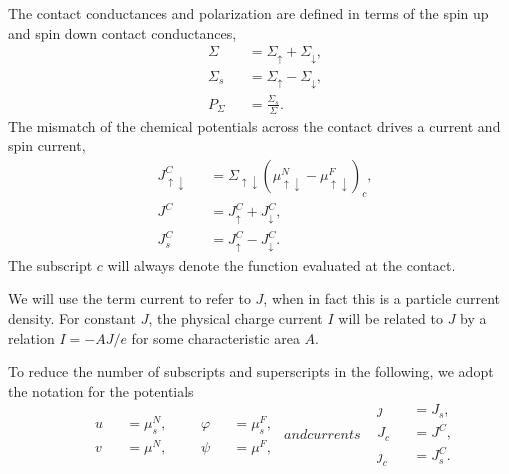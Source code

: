 The contact conductances and polarization are defined in terms
of the spin up and spin down contact conductances,
\begin{subequations}
  \label{eq:contact_conductances}
  \begin{alignat}{2}
    & Σ   && = Σ_↑ + Σ_↓ , \\
    & Σ_s && = Σ_↑ - Σ_↓ , \\
    & P_Σ && = \frac{Σ_s}{Σ} .
  \end{alignat}
\end{subequations}
The mismatch of the chemical potentials across the contact
drives a current and spin current,
\begin{subequations}
  \label{eq:contact_currents}
  \begin{alignat}{2}
    & J_{↑↓}^C && = Σ_{↑↓} \left( μ^N_{↑↓} - μ^F_{↑↓} \right)_c , \\
    & J^C      && = J_↑^C + J_↓^C , \\
    & J_s^C    && = J_↑^C - J_↓^C .
  \end{alignat}
\end{subequations}
The subscript $c$ will always denote the function evaluated at the contact.

We will use the term current to refer to $J$,
when in fact this is a particle current density.
For constant $J$, the physical charge current $I$ will be related to $J$
by a relation $I = - A J / e$ for some characteristic area $A$.

To reduce the number of subscripts and superscripts in the following,
we adopt the notation for the potentials
\begin{subequations}
  \begin{equation}
    \begin{aligned}
    & \begin{alignedat}{2}
        & u && = μ^N_s , \\
        & v && = μ^N   ,
      \end{alignedat}
    & \begin{alignedat}{2}
        & φ && = μ^F_s , \\
        & ψ && = μ^F   ,
      \end{alignedat}
    \end{aligned}
  \end{equation}
  and currents
  \begin{equation}
    \begin{alignedat}{2}
      & ȷ   && = J_s     , \\
      & J_c && = J^C     , \\
      & ȷ_c && = J_s^C   .
    \end{alignedat}
  \end{equation}
\end{subequations}

